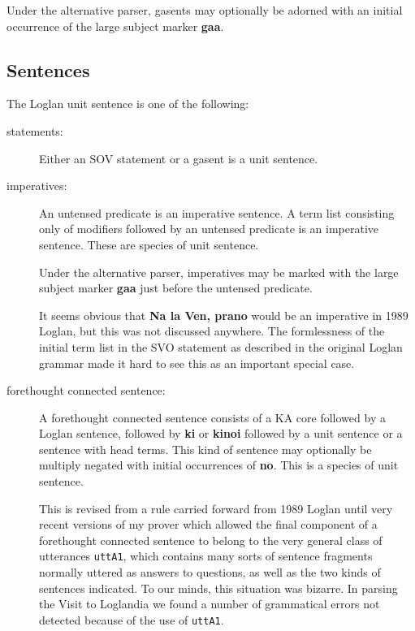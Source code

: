 \documentclass[12pt]{book}
\begin{document}
{Under the alternative parser, gasents may optionally be adorned with an initial occurrence of the large subject marker {\bf gaa}.

\subsection{Sentences}

The Loglan unit sentence is one of the following:

\begin{description}

\item[statements:]  Either an SOV statement or a gasent is a unit sentence.

\item[imperatives:]  An untensed predicate is an imperative sentence.  A term list consisting only of modifiers followed by an untensed predicate is an imperative sentence.  These are species of unit sentence.

Under the alternative parser, imperatives may be marked with the large subject marker {\bf gaa} just before the untensed predicate.

It seems obvious that
{\bf Na la Ven, prano}
would be an imperative in 1989 Loglan, but this was not discussed anywhere.  The formlessness of the initial term list in the SVO statement as described in the original Loglan grammar made it hard to see this as an important special case.

\item[forethought connected sentence:]  A forethought connected sentence consists of a KA core followed by a Loglan sentence, followed by {\bf ki} or {\bf kinoi} followed by a unit sentence or a sentence with head terms.  This kind of sentence may optionally be multiply negated with initial occurrences of {\bf no}.  This is a species of unit sentence.

This is revised from a rule carried forward from 1989 Loglan until very recent versions of my prover which allowed the final component of a forethought connected sentence to belong to the very general class of utterances {\tt uttA1}, which contains many sorts of sentence fragments normally uttered as answers to questions, as well as the two kinds of sentences indicated.  To our minds, this situation was bizarre.  In parsing the Visit to Loglandia we found a number of grammatical errors not detected because of the use of {\tt uttA1}.

\end{description}

}
\end{document}

